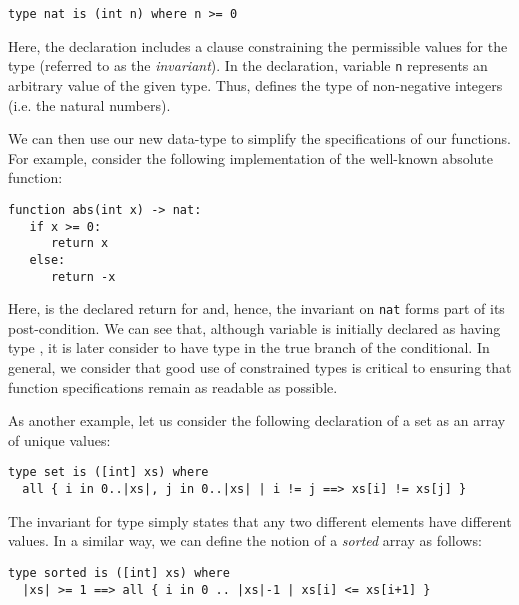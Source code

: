 \begin{tcolorbox}\begin{lstlisting}[language=Whiley]
type nat is (int n) where n >= 0
\end{lstlisting}\end{tcolorbox}

Here, the  declaration includes a  clause constraining the permissible values for the type (referred to as the {\em invariant}).  In the declaration, variable \lstinline{n} represents an arbitrary value of the given type.  Thus,  defines the type of non-negative integers (i.e. the natural numbers).

We can then use our new data-type to simplify the specifications of our functions.  For example, consider the following implementation of the well-known absolute function:

\begin{tcolorbox}\begin{lstlisting}[language=Whiley]
function abs(int x) -> nat:
   if x >= 0:
      return x
   else:
      return -x
\end{lstlisting}\end{tcolorbox}

Here,  is the declared return for  and, hence, the invariant on \lstinline{nat} forms part of its post-condition.  We can see that, although variable  is initially declared as having type , it is later consider to have type  in the true branch of the conditional.  In general, we consider that good use of constrained types is critical to ensuring that function specifications remain as readable as possible.

As another example, let us consider the following declaration of a set as an array of unique values:

\begin{tcolorbox}\begin{lstlisting}[language=Whiley]
type set is ([int] xs) where 
  all { i in 0..|xs|, j in 0..|xs| | i != j ==> xs[i] != xs[j] }
\end{lstlisting}\end{tcolorbox}

The invariant for type  simply states that any two different elements have different values.  In a similar way, we can define the notion of a {\em sorted} array as follows:

\begin{tcolorbox}\begin{lstlisting}[language=Whiley]
type sorted is ([int] xs) where 
  |xs| >= 1 ==> all { i in 0 .. |xs|-1 | xs[i] <= xs[i+1] }
\end{lstlisting}\end{tcolorbox} 

